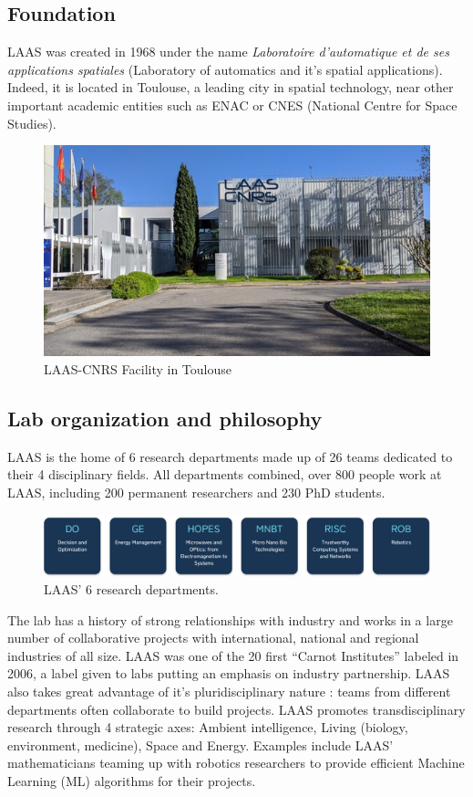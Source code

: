 \documentclass[a4paper,12pt]{article}
\theoremstyle{definition}
\theoremstyle{plain}
\begin{document}
\subsection{Foundation}
LAAS was created in 1968 under the name \textit{Laboratoire d'automatique et de ses applications spatiales} (Laboratory of automatics and it's spatial applications). Indeed, it is located in Toulouse, a leading city in spatial technology, near other important academic entities such as ENAC or CNES (National Centre for Space Studies).
\begin{figure}[H]
	\centering
	\includegraphics[width=0.4\linewidth]{figures/LAAS}
	\caption{LAAS-CNRS Facility in Toulouse}
	\label{fig:laas}
\end{figure}
\subsection{Lab organization and philosophy}
LAAS is the home of 6 research departments made up of 26 teams dedicated to their 4 disciplinary fields.
All departments combined, over 800 people work at LAAS, including 200 permanent researchers and 230 PhD students.
\begin{figure}[H]
	\centering
	\includegraphics[width=0.6\linewidth]{figures/LAAS_Departments}
	\caption{LAAS' 6 research departments.}
	\label{fig:laasdepartments}
\end{figure}
The lab has a history of strong relationships with industry and works in a large number of collaborative projects with international, national and regional industries of all size. LAAS was one of the 20 first “Carnot Institutes” labeled in 2006, a label given to labs putting an emphasis on industry partnership.
LAAS also takes great advantage of it's pluridisciplinary nature : teams from different departments often collaborate to build projects. LAAS promotes transdisciplinary research through 4 strategic axes: Ambient intelligence, Living (biology, environment, medicine), Space and Energy. Examples include LAAS' mathematicians teaming up with robotics researchers to provide efficient Machine Learning (ML) algorithms for their projects.
\end{document}
